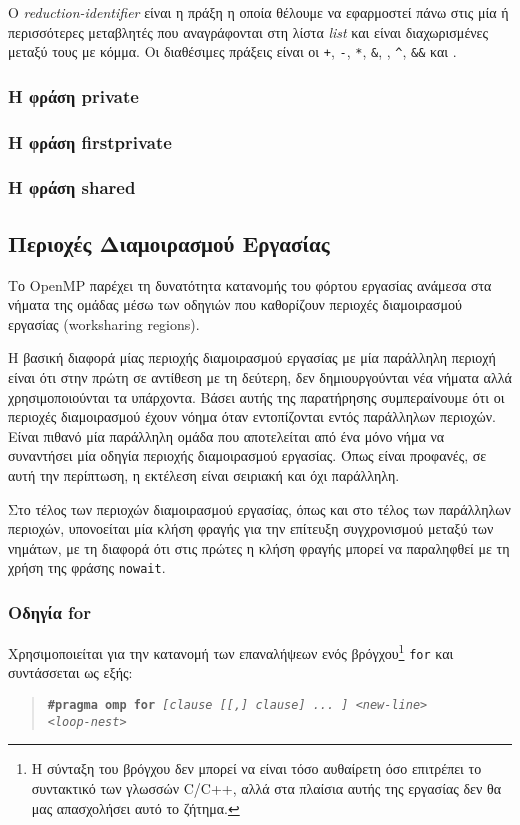 Ο \emph{reduction-identifier} είναι η πράξη η οποία θέλουμε να εφαρμοστεί πάνω στις μία ή περισσότερες μεταβλητές που αναγράφονται στη λίστα \emph{list} και είναι διαχωρισμένες μεταξύ τους με κόμμα. Οι διαθέσιμες πράξεις είναι οι \texttt{+}, \texttt{-}, \texttt{*}, \texttt{\&}, \texttt{\textbar}, \texttt{\string^}, \texttt{\&\&} και \texttt{\textbar\textbar}.

\subsubsection{Η φράση private}

\subsubsection{Η φράση firstprivate}

\subsubsection{Η φράση shared}

\subsection{Περιοχές Διαμοιρασμού Εργασίας}
Το OpenMP παρέχει τη δυνατότητα κατανομής του φόρτου εργασίας ανάμεσα στα νήματα της ομάδας μέσω των οδηγιών που καθορίζουν περιοχές διαμοιρασμού εργασίας (worksharing regions).

Η βασική διαφορά μίας περιοχής διαμοιρασμού εργασίας με μία παράλληλη περιοχή είναι ότι στην πρώτη σε αντίθεση με τη δεύτερη, δεν δημιουργούνται νέα νήματα αλλά χρησιμοποιούνται τα υπάρχοντα. Βάσει αυτής της παρατήρησης συμπεραίνουμε ότι οι περιοχές διαμοιρασμού έχουν νόημα όταν εντοπίζονται εντός παράλληλων περιοχών. Είναι πιθανό μία παράλληλη ομάδα που αποτελείται από ένα μόνο νήμα να συναντήσει μία οδηγία περιοχής διαμοιρασμού εργασίας. Όπως είναι προφανές, σε αυτή την περίπτωση, η εκτέλεση είναι σειριακή και όχι παράλληλη.

Στο τέλος των περιοχών διαμοιρασμού εργασίας, όπως και στο τέλος των παράλληλων περιοχών, υπονοείται μία κλήση φραγής για την επίτευξη συγχρονισμού μεταξύ των νημάτων, με τη διαφορά ότι στις πρώτες η κλήση φραγής μπορεί να παραληφθεί με τη χρήση της φράσης \texttt{nowait}.

\subsubsection{Οδηγία for}
Χρησιμοποιείται για την κατανομή των επαναλήψεων ενός βρόγχου\footnote{Η σύνταξη του βρόγχου δεν μπορεί να είναι τόσο αυθαίρετη όσο επιτρέπει το συντακτικό των γλωσσών C/C++, αλλά στα πλαίσια αυτής της εργασίας δεν θα μας απασχολήσει αυτό το ζήτημα.} \texttt{for} και συντάσσεται ως εξής:
\begin{quote}
	\texttt{\textbf{\#pragma omp for} \textit{[clause [[,] clause] ... ] <new-line>}} \\
		\texttt{\textit{<loop-nest>}}
\end{quote}

